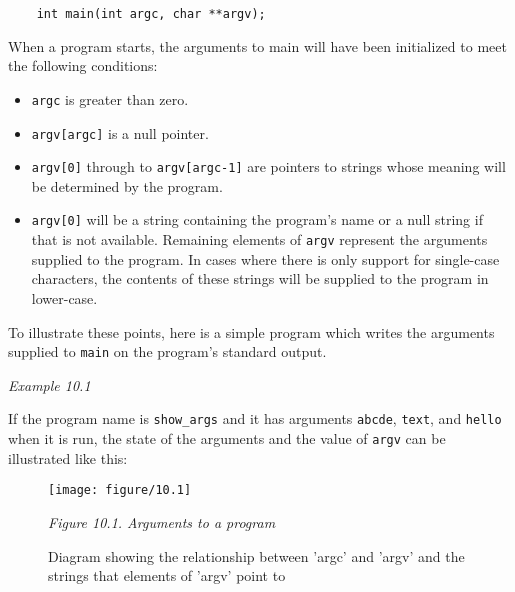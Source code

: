   \begin{Verbatim}
    int main(int argc, char **argv);
  \end{Verbatim}

  When a program starts, the arguments to main will have been initialized
   to meet the following conditions:


  \begin{itemize}
   \item \texttt{argc} is greater than zero.

   \item \texttt{argv[argc]} is a null pointer.

   \item \texttt{argv[0]} through to \texttt{argv[argc-1]} are
    pointers to strings whose meaning will be determined by the
    program.

   \item \texttt{argv[0]} will be a string containing the program's name
    or a null string if that is not available. Remaining elements of
    \texttt{argv} represent the arguments supplied to the program. In
    cases where there is only support for single-case characters, the
    contents of these strings will be supplied to the program in
    lower-case.
  \end{itemize}

  To illustrate these points, here is a simple program which writes the
   arguments supplied to \texttt{main} on the program's standard
   output.


   \begin{center}\textit{Example 10.1}\end{center}


  If the program name is \texttt{show\_args} and it has arguments
   \texttt{abcde}, \texttt{text}, and \texttt{hello} when it is
   run, the state of the arguments and the value of \texttt{argv} can be
   illustrated like this:


   \begin{figure*}\centering
     \texttt{[image: figure/10.1]}
     \caption{Diagram showing the relationship between 'argc' and 'argv'                and the strings that elements of 'argv' point to}
   \begin{center}\textit{Figure 10.1. Arguments to a program}\end{center}
   \end{figure*}


